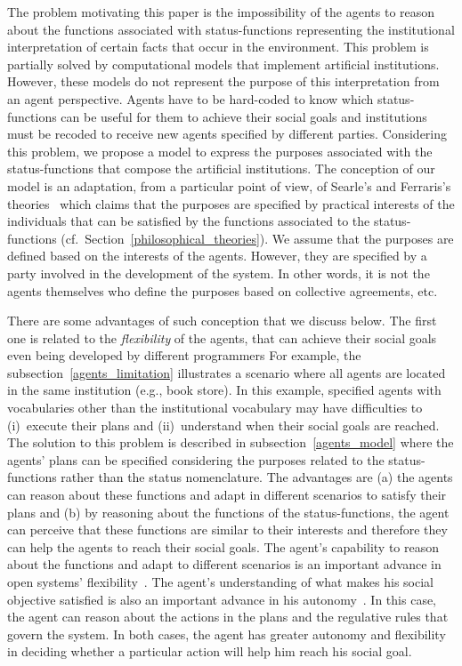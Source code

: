 \documentclass[runningheads]{llncs}
\begin{document}
The problem motivating this paper is the impossibility of the agents to reason about the functions associated with status-functions representing the institutional interpretation of certain facts that occur in the environment.
This problem is partially solved by computational models that implement artificial institutions. 
However, these models do not represent the purpose of this interpretation from an agent perspective. Agents have to be hard-coded to know which status-functions can be useful for them to achieve their social goals and institutions must be recoded to receive new agents specified by different parties. Considering this problem, we propose a model to express the purposes associated with the status-functions that compose the artificial institutions. %
The conception of our model is an adaptation, from a particular point of view, of Searle's and Ferraris's  theories~\cite{searle1995construction,searle2010making,condello2019money,condello2018two} which claims that the purposes are specified by practical interests of the individuals that can be satisfied by the functions associated to the status-functions (cf.~Section~\ref{philosophical_theories}). 
We assume that the purposes are defined based on the interests of the agents. However, they are specified by a party involved in the development of the system. In other words, it is not the agents themselves who define the purposes based on collective agreements, etc.

There are some advantages of such conception that we discuss below.
The first one is related to the \emph{flexibility} of
the agents, that can achieve their social goals even being developed by different programmers
For example, the subsection~\ref{agents_limitation} illustrates a scenario where all agents are located in the same institution (e.g., book store). 
In this example, specified agents with vocabularies other than the institutional vocabulary may have difficulties to (i)~execute their plans and (ii)~understand when their social goals are reached.
The solution to this problem is described in subsection~\ref{agents_model} where the agents' plans can be specified considering the purposes related to the status-functions rather than the status nomenclature.
The advantages are (a) the agents can reason about these functions and adapt in different scenarios to satisfy their plans and (b) by reasoning about the functions of the status-functions, the agent can perceive that these functions are similar to their interests and therefore they can help the agents to reach their social goals.
The agent's capability to reason about the functions and adapt to different scenarios is an important advance in open systems' flexibility~\cite{aldewereld2010operetta,zambonelli2000organisational}.
The agent's understanding of what makes his social objective satisfied is also an important advance in his autonomy~\cite{Rodriguez-Aguilar2015}. In this case, the agent can reason about the actions in the plans and the regulative rules that govern the system. In both cases, the agent has greater autonomy and flexibility in deciding whether a particular action will help him reach his social goal.
\end{document}
